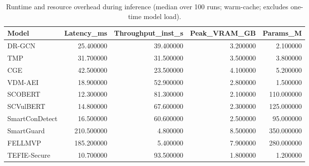 \begin{table}[t]
\centering
\begin{tabular}{lrrrr}
\toprule
Model & Latency_ms & Throughput_inst_s & Peak_VRAM_GB & Params_M \\
\midrule
DR-GCN & 25.400000 & 39.400000 & 3.200000 & 2.100000 \\
TMP & 31.700000 & 31.500000 & 3.500000 & 3.800000 \\
CGE & 42.500000 & 23.500000 & 4.100000 & 5.200000 \\
VDM-AEI & 18.900000 & 52.900000 & 2.800000 & 1.500000 \\
SCOBERT & 12.300000 & 81.300000 & 2.100000 & 110.000000 \\
SCVulBERT & 14.800000 & 67.600000 & 2.300000 & 125.000000 \\
SmartConDetect & 16.500000 & 60.600000 & 2.500000 & 95.000000 \\
SmartGuard & 210.500000 & 4.800000 & 8.500000 & 350.000000 \\
FELLMVP & 185.200000 & 5.400000 & 7.900000 & 280.000000 \\
TEFIE-Secure & 10.700000 & 93.500000 & 1.800000 & 1.200000 \\
\bottomrule
\end{tabular}
\caption{Runtime and resource overhead during inference (median over 100 runs; warm-cache; excludes one-time model load).}
\label{tab:runtime}
\end{table}

